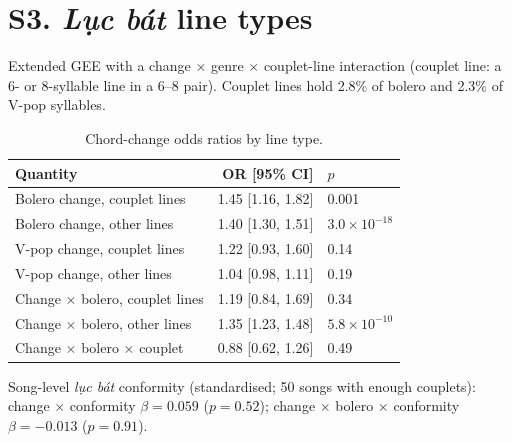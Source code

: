 \documentclass[11pt]{article}
\begin{document}
\section*{S3. \emph{Lục bát} line types}
Extended GEE with a change $\times$ genre $\times$ couplet-line interaction (couplet line: a 6- or 8-syllable line in a 6--8 pair). Couplet lines hold 2.8\% of bolero and 2.3\% of V-pop syllables.
\begin{table}[H]\centering\caption{Chord-change odds ratios by line type.}
\begin{tabular}{lrl}\toprule Quantity & OR [95\% CI] & $p$\\\midrule
Bolero change, couplet lines & 1.45 [1.16, 1.82] & 0.001\\
Bolero change, other lines & 1.40 [1.30, 1.51] & $3.0\times10^{-18}$\\
V-pop change, couplet lines & 1.22 [0.93, 1.60] & 0.14\\
V-pop change, other lines & 1.04 [0.98, 1.11] & 0.19\\
Change $\times$ bolero, couplet lines & 1.19 [0.84, 1.69] & 0.34\\
Change $\times$ bolero, other lines & 1.35 [1.23, 1.48] & $5.8\times10^{-10}$\\
Change $\times$ bolero $\times$ couplet & 0.88 [0.62, 1.26] & 0.49\\
\bottomrule\end{tabular}\end{table}
Song-level \emph{lục bát} conformity (standardised; 50 songs with enough couplets): change $\times$ conformity $\beta=0.059$ ($p=0.52$); change $\times$ bolero $\times$ conformity $\beta=-0.013$ ($p=0.91$).
\end{document}

